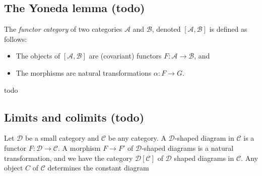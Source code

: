 \subsection{The Yoneda lemma (todo)}
\begin{definition}
    The \emph{functor category} of two categories $\mathcal{A} $ and $\mathcal{B} $, denoted $[\mathcal{A} ,\mathcal{B} ]$ is defined as follows:
    \begin{itemize}
        \item The objects of $[\mathcal{A} ,\mathcal{B} ]$ are (covariant) functors $F \colon \mathcal{A}  \to \mathcal{B} $, and 
        \item The morphisms are natural transformations $\alpha \colon F \to G$.
    \end{itemize}
\end{definition}
todo

\subsection{Limits and colimits (todo)}
Let $\mathcal{D} $ be a small category and $\mathcal{C} $ be any category. A $\mathcal{D} $-shaped diagram in $\mathcal{C} $ is a functor $F \colon \mathcal{D}  \to \mathcal{C} $. A morphism $F\to F'$ of $\mathcal{D} $-shaped diagrams is a natural transformation, and we have the category $\mathcal{D} [\mathcal{C} ]$ of $\mathcal{D} $ shaped diagrams in $\mathcal{C} $. Any object $C$ of $\mathcal{C} $ determines the constant diagram
